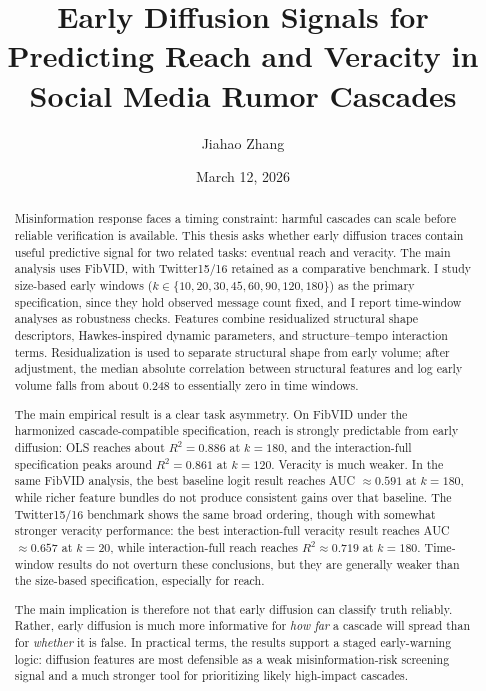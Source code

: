 \documentclass{article}
\title{Early Diffusion Signals for Predicting Reach and Veracity in Social Media Rumor Cascades}
\author{Jiahao Zhang}
\date{March 12, 2026}
\begin{document}
\maketitle
\begin{abstract}
Misinformation response faces a timing constraint: harmful cascades can scale before reliable verification is available. This thesis asks whether early diffusion traces contain useful predictive signal for two related tasks: eventual reach and veracity. The main analysis uses FibVID, with Twitter15/16 retained as a comparative benchmark. I study size-based early windows ($k \in \{10,20,30,45,60,90,120,180\}$) as the primary specification, since they hold observed message count fixed, and I report time-window analyses as robustness checks. Features combine residualized structural shape descriptors, Hawkes-inspired dynamic parameters, and structure--tempo interaction terms. Residualization is used to separate structural shape from early volume; after adjustment, the median absolute correlation between structural features and log early volume falls from about 0.248 to essentially zero in time windows.

The main empirical result is a clear task asymmetry. On FibVID under the harmonized cascade-compatible specification, reach is strongly predictable from early diffusion: OLS reaches about $R^2=0.886$ at $k=180$, and the interaction-full specification peaks around $R^2=0.861$ at $k=120$. Veracity is much weaker. In the same FibVID analysis, the best baseline logit result reaches AUC $\approx 0.591$ at $k=180$, while richer feature bundles do not produce consistent gains over that baseline. The Twitter15/16 benchmark shows the same broad ordering, though with somewhat stronger veracity performance: the best interaction-full veracity result reaches AUC $\approx 0.657$ at $k=20$, while interaction-full reach reaches $R^2 \approx 0.719$ at $k=180$. Time-window results do not overturn these conclusions, but they are generally weaker than the size-based specification, especially for reach.

The main implication is therefore not that early diffusion can classify truth reliably. Rather, early diffusion is much more informative for \emph{how far} a cascade will spread than for \emph{whether} it is false. In practical terms, the results support a staged early-warning logic: diffusion features are most defensible as a weak misinformation-risk screening signal and a much stronger tool for prioritizing likely high-impact cascades.
\end{abstract} \hspace{10pt}
\end{document}
